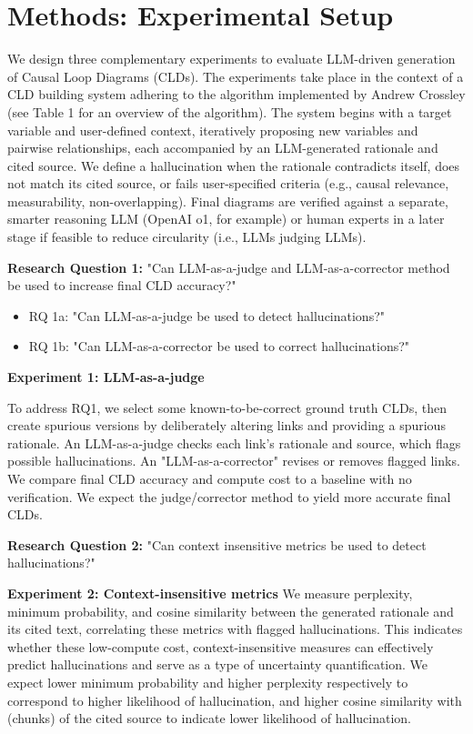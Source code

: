 \chapter{Methods: Experimental Setup}
\label{Methods}
We design three complementary experiments to evaluate LLM-driven generation of Causal Loop Diagrams (CLDs). The experiments take place in the context of a CLD building system adhering to the algorithm implemented by Andrew Crossley (see Table 1 for an overview of the algorithm). The system begins with a target variable and user-defined context, iteratively proposing new variables and pairwise relationships, each accompanied by an LLM-generated rationale and cited source. We define a hallucination when the rationale contradicts itself, does not match its cited source, or fails user-specified criteria (e.g., causal relevance, measurability, non-overlapping). Final diagrams are verified against a separate, smarter reasoning LLM (OpenAI o1, for example) or human experts in a later stage if feasible to reduce circularity (i.e., LLMs judging LLMs).

\textbf{Research Question 1:} "Can LLM-as-a-judge and LLM-as-a-corrector method be used to increase final CLD accuracy?"
\begin{itemize}
\item RQ 1a: "Can LLM-as-a-judge be used to detect hallucinations?"
\item RQ 1b: "Can LLM-as-a-corrector be used to correct hallucinations?"
\end{itemize}
\textbf{Experiment 1: LLM-as-a-judge}

To address RQ1, we select some known-to-be-correct ground truth CLDs, then create spurious versions by deliberately altering links and providing a spurious rationale. An LLM-as-a-judge checks each link's rationale and source, which flags possible hallucinations. An "LLM-as-a-corrector" revises or removes flagged links. We compare final CLD accuracy and compute cost to a baseline with no verification. We expect the judge/corrector method to yield more accurate final CLDs.

\textbf{Research Question 2:} "Can context insensitive metrics be used to detect hallucinations?"

\textbf{Experiment 2: Context-insensitive metrics}
We measure perplexity, minimum probability, and cosine similarity between the generated rationale and its cited text, correlating these metrics with flagged hallucinations. This indicates whether these low-compute cost, context-insensitive measures can effectively predict hallucinations and serve as a type of uncertainty quantification. We expect lower minimum probability and higher perplexity respectively to correspond to higher likelihood of hallucination, and higher cosine similarity with (chunks) of the cited source to indicate lower likelihood of hallucination.

